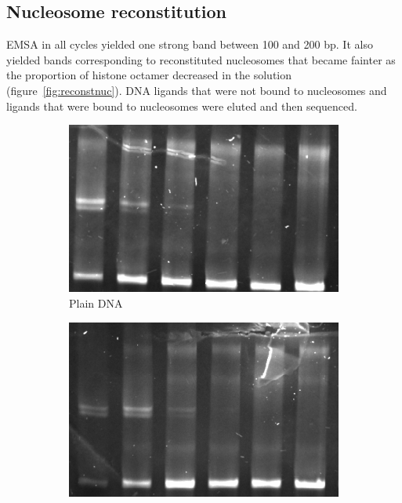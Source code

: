 \documentclass[parskip=full, numbers=noenddot]{scrreprt}
\begin{document}
\subsection{Nucleosome reconstitution}
\label{ssec:reconstnuc}

EMSA in all cycles yielded one strong band between 100 and 200 bp. It also yielded bands corresponding to reconstituted nucleosomes that became fainter as the proportion of histone octamer decreased in the solution (figure~\ref{fig:reconstnuc}).  DNA ligands that were not bound to nucleosomes and ligands that were bound to nucleosomes were eluted and then sequenced.

\begin{figure}[htpb]
  \centering
  \begin{subfigure}[htpb]{0.4\textwidth}
    \centering
    \includegraphics[width=\textwidth]{reconstnuc_a}
    \caption{Plain DNA}
    \label{fig:reconstnuc_a}
  \end{subfigure}
  \begin{subfigure}[htpb]{0.4\textwidth}
    \centering
    \includegraphics[width=\textwidth]{reconstnuc_b}

\end{subfigure}
\end{figure}
\end{document}
